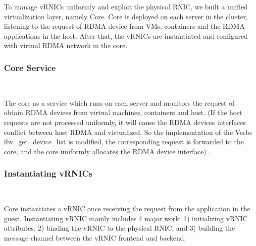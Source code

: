 
To manage vRNICs uniformly and exploit the physical RNIC, we built a unified virtualization layer, namely \sys Core. \sys Core is deployed on each server in the cluster, listening to the request of RDMA device from VMs, containers and the RDMA applications in the host. After that, the vRNICs are instantiated and configured with virtual RDMA network in the \sys core.


\subsubsection{\textbf{\sys Core Service}}
\
\noindent


The \sys core as a service which runs on each server and monitors the request of obtain RDMA devices from virtual machines, containers and host. (If the host requests are not processed uniformly, it will cause the RDMA devices interfaces conflict between host RDMA and virtualized. So the implementation of the Verbs ibv\_get\_device\_list is modified, the corresponding request is forwarded to the \sys core, and the \sys core uniformly allocates the RDMA device interface) .

\subsubsection{\textbf{Instantiating vRNICs}}
\
\noindent


\sys Core instantiates a vRNIC  once receiving the request from the application in the guest. Instantiating vRNIC mainly includes 4 major work: 1) initializing vRNIC attributes, 2) binding the vRNIC to the physical RNIC, and 3) building the message channel between the vRNIC frontend and backend.

